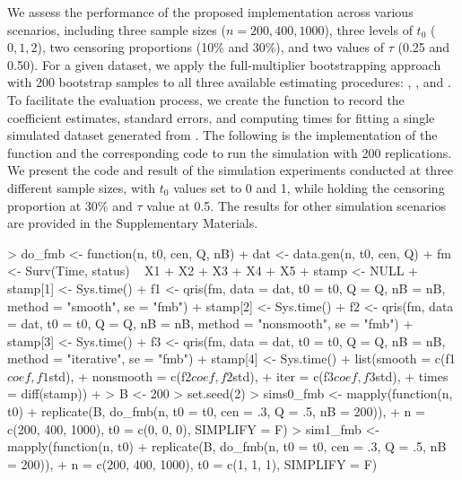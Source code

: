 We assess the performance of the proposed implementation across various scenarios, 
including three sample sizes ($n = 200, 400, 1000$), three levels of $t_0$ ($0, 1, 2$), 
two censoring proportions (10\% and 30\%), and two values of $\tau$ (0.25 and 0.50).
For a given dataset, we apply the full-multiplier bootstrapping approach with 200 bootstrap samples
to all three available estimating procedures: 
, , and . 
To facilitate the evaluation process, we create the  function
to record the coefficient estimates, standard errors, 
and computing times for fitting a single simulated dataset generated from .
The following is the implementation of the  function and the corresponding code 
to run the simulation with 200 replications.
We present the code and result of the simulation experiments conducted at three different sample sizes, 
with $t_0$ values set to 0 and 1,
while holding the censoring proportion at 30\% and $\tau$ value at 0.5.
The results for other simulation scenarios are provided in the Supplementary Materials.
\begin{example}
  > do_fmb <- function(n, t0, cen, Q, nB) {
  +   dat <- data.gen(n, t0, cen, Q)
  +   fm <- Surv(Time, status) ~ X1 + X2 + X3 + X4 + X5
  +   stamp <- NULL
  +   stamp[1] <- Sys.time()
  +   f1 <- qris(fm, data = dat, t0 = t0, Q = Q, nB = nB, method = "smooth", se = "fmb")
  +   stamp[2] <- Sys.time()
  +   f2 <- qris(fm, data = dat, t0 = t0, Q = Q, nB = nB, method = "nonsmooth", se = "fmb")
  +   stamp[3] <- Sys.time()
  +   f3 <- qris(fm, data = dat, t0 = t0, Q = Q, nB = nB, method = "iterative", se = "fmb")
  +   stamp[4] <- Sys.time()
  +   list(smooth = c(f1$coef, f1$std),
  +     nonsmooth = c(f2$coef, f2$std),
  +     iter = c(f3$coef, f3$std),
  +     times = diff(stamp))
  + }
  > B <- 200
  > set.seed(2)
  > sims0_fmb <- mapply(function(n, t0)
    +     replicate(B, do_fmb(n, t0 = t0, cen = .3, Q = .5, nB = 200)),
    +     n = c(200, 400, 1000), t0 = c(0, 0, 0), SIMPLIFY = F)
  > sim1_fmb <- mapply(function(n, t0)
    +     replicate(B, do_fmb(n, t0 = t0, cen = .3, Q = .5, nB = 200)),
    +     n = c(200, 400, 1000), t0 = c(1, 1, 1), SIMPLIFY = F)
\end{example}
% 

